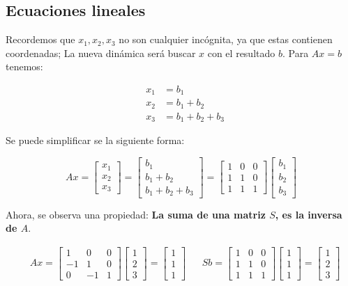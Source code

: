 \subsection{Ecuaciones lineales}
Recordemos que $x_{1},x_2 ,x_{3}$ no son cualquier incógnita, ya que estas contienen coordenadas;
La nueva dinámica será buscar $x$ con el resultado $b$. Para $Ax=b$ tenemos:

\begin{align*}
	 & x_1& =b_1            \\
	 & x_2& =b_{1}+b_2      \\
	 & x_3 & =b_{1}+b_2 +b_{3}
\end{align*}

Se puede simplificar se la siguiente forma:

\begin{equation}
	Ax= \begin{bmatrix} x_{1}\\ x_2 \\ x_3 \end{bmatrix}=\begin{bmatrix} b_1\\ b_{1}+b_2 \\ b_{1}+b_2 +b_3 \end{bmatrix} =\begin{bmatrix} 1 & 0 &0 \\ 1 & 1 &0 \\ 1 & 1 & 1 \end{bmatrix}\begin{bmatrix} b_{1}\\ b_2 \\ b_3 \end{bmatrix}
\end{equation}

Ahora, se observa una propiedad: \textbf{La suma de una matriz $S$, es la inversa de $A$}.

\begin{align*}
	 & Ax=\begin{bmatrix} 1 & 0 &0 \\ -1 & 1 &0 \\ 0 &-1 & 1 \end{bmatrix} \begin{bmatrix} 1\\ 2\\ 3 \end{bmatrix}= \begin{bmatrix} 1 \\ 1 \\ 1 \end{bmatrix} &  & Sb= \begin{bmatrix} 1 & 0 &0 \\ 1 & 1 &0 \\ 1 & 1 & 1 \end{bmatrix}\begin{bmatrix} 1 \\ 1 \\ 1 \end{bmatrix}=\begin{bmatrix} 1 \\ 2 \\ 3 \end{bmatrix}
\end{align*}

